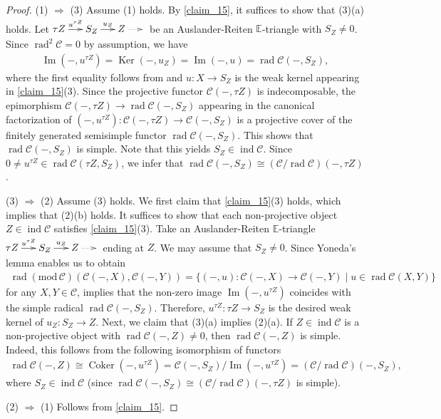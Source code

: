 \documentclass[12pt]{amsart}
\makeatletter
\numberwithin{equation}{subsection}
\theoremstyle{plain}
\theoremstyle{definition}
\renewcommand{\Im}{\operatorname{Im}}
\newcommand{\Ker}{\operatorname{Ker}}
\newcommand{\Coker}{\operatorname{Coker}\nolimits}
\newcommand{\rad}{\operatorname{rad}}
\renewcommand{\mod}{\mathrm{mod}\,}
\newcommand{\ind}{\operatorname{ind}}
\newcommand{\C}{\mathcal{C}}
\newcommand{\E}{\mathbb{E}}
\newcommand{\tri}[6]{\!\!\xymatrix@C=5mm{#1\ar[r]^-{#2}&#3\ar[r]^-{#4}&#5\ar@{..>}[r]^-{#6}&}\!\!}
\makeatother
\begin{document}
\begin{proof} 
(1) $\Rightarrow$ (3)
Assume (1) holds.
By \cref{claim_15}, it suffices to show that (3)(a) holds.
Let $\tri{\tau Z}{u^{\tau Z}}{S_Z}{u_Z}{Z}{}$ be an Auslander-Reiten $\E$-triangle with $S_Z\neq 0$.
Since $\rad^2\C = 0$ by assumption, we have 
\begin{align}
    \Im(-,u^{\tau Z}) = \Ker(-, u_Z) = \Im(-,u) = \rad\C(-, S_Z),
\end{align}
where the first equality follows from \cite[Proposition 3.3]{Nakaoka-Palu_2019_extriangulated} and $u:X\to S_Z$ is the weak kernel appearing in \cref{claim_15}(3).
Since the projective functor $\C(-, \tau Z)$ is indecomposable, the epimorphism $\C(-, \tau Z) \to\rad\C(-, S_Z)$ appearing in the canonical factorization of $(-,u^{\tau Z}): \C(-, \tau Z) \to\C(-, S_Z)$ is a projective cover of the finitely generated semisimple functor $\rad\C(-, S_Z)$.
This shows that $\rad\C(-, S_Z)$ is simple.
Note that this yields $S_Z \in \ind\C$. 
Since $0\neq u^{\tau Z} \in \rad\C(\tau Z, S_Z)$, we infer that $\rad\C(-, S_Z)\cong (\C/\rad\C)(-, \tau Z)$.



(3) $\Rightarrow$ (2)
Assume (3) holds.
We first claim that \cref{claim_15}(3) holds, which implies that (2)(b) holds.
It suffices to show that each non-projective object $Z\in\ind\C$ satisfies \cref{claim_15}(3).
Take an Auslander-Reiten $\E$-triangle $\tri{\tau Z}{u^{\tau Z}}{S_Z}{u_Z}{Z}{}$ ending at $Z$.
We may assume that $S_Z\neq 0$.
Since Yoneda's lemma enables us to obtain
\begin{align}
    \rad(\mod\C)(\C(-, X), \C(-, Y))
    =\{(-, u) :\C(-, X) \to \C(-, Y) \mid u \in \rad\C(X, Y)\}
\end{align}
for any $X, Y\in\C$, \cite[Corollary 3.8]{Krause_2015} implies that the non-zero image $\Im(-, u^{\tau Z})$ coincides with the simple radical $\rad\C(-, S_Z)$.
Therefore, $u^{\tau Z}:\tau Z\to S_Z$ is the desired weak kernel of $u_Z: S_Z \to Z$.
Next, we claim that (3)(a) implies (2)(a).
If $Z\in\ind\C$ is a non-projective object with $\rad\C(-, Z)\neq 0$, then $\rad\C(-, Z)$ is simple.
Indeed, this follows from the following isomorphism of functors
\begin{align}
    \rad\C(-, Z) \cong \Coker(-, u^{\tau Z}) = \C(-, S_Z)/\Im(-, u^{\tau Z}) = (\C/\rad\C)(-, S_Z),
\end{align}
where $S_Z \in \ind\C$ (since $\rad\C(-, S_Z)\cong (\C/\rad\C)(-,\tau Z)$ is simple).




(2) $\Rightarrow$ (1)
Follows from \cref{claim_15}.
\end{proof}
\end{document}
